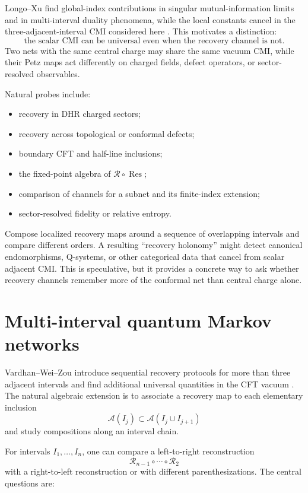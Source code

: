 \documentclass[11pt]{article}
\theoremstyle{accenttheorem}
\theoremstyle{definition}
\newcommand{\cA}{\mathcal{A}}
\newcommand{\cR}{\mathcal{R}}
\newcommand{\1}{\mathbf{1}}
\begin{document}
Longo--Xu find global-index contributions in singular mutual-information limits and in multi-interval duality phenomena, while the local constants cancel in the three-adjacent-interval CMI considered here \cite{LongoXu}.  This motivates a distinction:
\[
 \boxed{
 \text{the scalar CMI can be universal even when the recovery channel is not.}
 }
\]
Two nets with the same central charge may share the same vacuum CMI, while their Petz maps act differently on charged fields, defect operators, or sector-resolved observables.

Natural probes include:
\begin{itemize}
\item recovery in DHR charged sectors;
\item recovery across topological or conformal defects;
\item boundary CFT and half-line inclusions;
\item the fixed-point algebra of \(\cR\circ\operatorname{Res}\);
\item comparison of channels for a subnet and its finite-index extension;
\item sector-resolved fidelity or relative entropy.
\end{itemize}

\begin{highriskbox}
Compose localized recovery maps around a sequence of overlapping intervals and compare different orders.  A resulting ``recovery holonomy'' might detect canonical endomorphisms, Q-systems, or other categorical data that cancel from scalar adjacent CMI.  This is speculative, but it provides a concrete way to ask whether recovery channels remember more of the conformal net than central charge alone.
\end{highriskbox}

\section{Multi-interval quantum Markov networks}

Vardhan--Wei--Zou introduce sequential recovery protocols for more than three adjacent intervals and find additional universal quantities in the CFT vacuum \cite{VardhanWeiZou}.  The natural algebraic extension is to associate a recovery map to each elementary inclusion
\[
 \cA(I_j)
 \subset
 \cA(I_j\cup I_{j+1})
\]
and study compositions along an interval chain.

For intervals \(I_1,\ldots,I_n\), one can compare a left-to-right reconstruction
\[
 \cR_{n-1}\circ\cdots\circ\cR_2
\]
with a right-to-left reconstruction or with different parenthesizations.  The central questions are:
\end{document}
